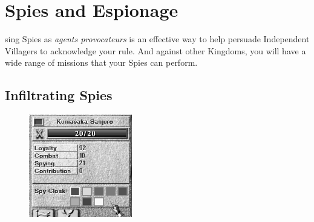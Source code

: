 
\chapter{Spies and Espionage}


sing Spies as \textit{agents provocateurs} is an effective way to help persuade Independent Villagers to acknowledge your rule. And against other Kingdoms, you will have a wide range of missions that your Spies can perform.

\section{Infiltrating Spies}

\begin{figure}
	\vspace{-20pt}
	\begin{center}
		\includegraphics[width=0.4\textwidth]{Ispyinfo}
	\end{center}
	\vspace{-20pt}
\end{figure}

